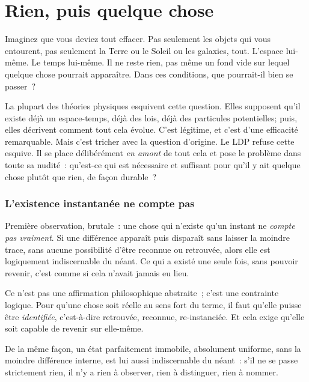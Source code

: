 \documentclass[12pt, a4paper, openright]{book}
\begin{document}
\chapter{Rien, puis quelque chose}

Imaginez que vous deviez tout effacer. Pas seulement les objets qui vous entourent, pas seulement la Terre ou le Soleil ou les galaxies, tout. L'espace lui-même. Le temps lui-même. Il ne reste rien, pas même un fond vide sur lequel quelque chose pourrait apparaître. Dans ces conditions, que pourrait-il bien se passer~?

\medskip

La plupart des théories physiques esquivent cette question. Elles supposent qu'il existe déjà un espace-temps, déjà des lois, déjà des particules potentielles; puis, elles décrivent comment tout cela évolue. C'est légitime, et c'est d'une efficacité remarquable. Mais c'est tricher avec la question d'origine. Le LDP refuse cette esquive. Il se place délibérément \emph{en amont} de tout cela et pose le problème dans toute sa nudité~: qu'est-ce qui est nécessaire et suffisant pour qu'il y ait quelque chose plutôt que rien, de façon durable~?

\subsection*{L'existence instantanée ne compte pas}

Première observation, brutale~: une chose qui n'existe qu'un instant ne \emph{compte pas vraiment}. Si une différence apparaît puis disparaît sans laisser la moindre trace, sans aucune possibilité d'être reconnue ou retrouvée, alors elle est logiquement indiscernable du néant. Ce qui a existé une seule fois, sans pouvoir revenir, c'est comme si cela n'avait jamais eu lieu.

\medskip

Ce n'est pas une affirmation philosophique abstraite~; c'est une contrainte logique. Pour qu'une chose soit réelle au sens fort du terme, il faut qu'elle puisse être \emph{identifiée}, c'est-à-dire retrouvée, reconnue, re-instanciée. Et cela exige qu'elle soit capable de revenir sur elle-même.

\medskip

De la même façon, un état parfaitement immobile, absolument uniforme, sans la moindre différence interne, est lui aussi indiscernable du néant~: s'il ne se passe strictement rien, il n'y a rien à observer, rien à distinguer, rien à nommer.
\end{document}
